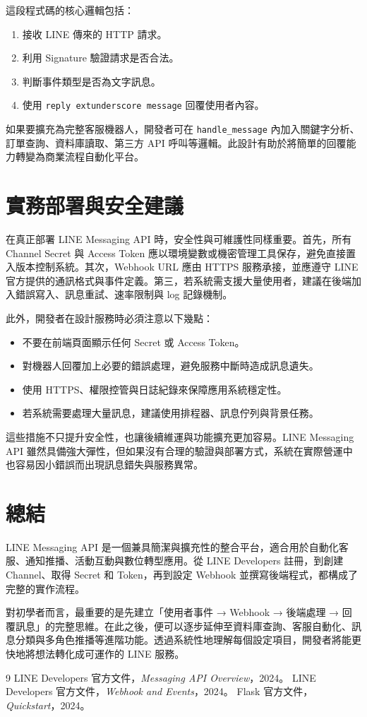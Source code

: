 這段程式碼的核心邏輯包括：
\begin{enumerate}[leftmargin=2em]
    \item 接收 LINE 傳來的 HTTP 請求。
    \item 利用 Signature 驗證請求是否合法。
    \item 判斷事件類型是否為文字訊息。
    \item 使用 \texttt{reply	extunderscore message} 回覆使用者內容。
\end{enumerate}

如果要擴充為完整客服機器人，開發者可在 \texttt{handle\_message} 內加入關鍵字分析、訂單查詢、資料庫讀取、第三方 API 呼叫等邏輯。此設計有助於將簡單的回覆能力轉變為商業流程自動化平台。

\section{實務部署與安全建議}

在真正部署 LINE Messaging API 時，安全性與可維護性同樣重要。首先，所有 Channel Secret 與 Access Token 應以環境變數或機密管理工具保存，避免直接置入版本控制系統。其次，Webhook URL 應由 HTTPS 服務承接，並應遵守 LINE 官方提供的通訊格式與事件定義。第三，若系統需支援大量使用者，建議在後端加入錯誤寫入、訊息重試、速率限制與 log 記錄機制。

此外，開發者在設計服務時必須注意以下幾點：
\begin{itemize}[leftmargin=2em]
    \item 不要在前端頁面顯示任何 Secret 或 Access Token。
    \item 對機器人回覆加上必要的錯誤處理，避免服務中斷時造成訊息遺失。
    \item 使用 HTTPS、權限控管與日誌紀錄來保障應用系統穩定性。
    \item 若系統需要處理大量訊息，建議使用排程器、訊息佇列與背景任務。
\end{itemize}

這些措施不只提升安全性，也讓後續維運與功能擴充更加容易。LINE Messaging API 雖然具備強大彈性，但如果沒有合理的驗證與部署方式，系統在實際營運中也容易因小錯誤而出現訊息錯失與服務異常。

\section{總結}

LINE Messaging API 是一個兼具簡潔與擴充性的整合平台，適合用於自動化客服、通知推播、活動互動與數位轉型應用。從 LINE Developers 註冊，到創建 Channel、取得 Secret 和 Token，再到設定 Webhook 並撰寫後端程式，都構成了完整的實作流程。

對初學者而言，最重要的是先建立「使用者事件 → Webhook → 後端處理 → 回覆訊息」的完整思維。在此之後，便可以逐步延伸至資料庫查詢、客服自動化、訊息分類與多角色推播等進階功能。透過系統性地理解每個設定項目，開發者將能更快地將想法轉化成可運作的 LINE 服務。

\begin{thebibliography}{9}
 LINE Developers 官方文件，\textit{Messaging API Overview}，2024。
 LINE Developers 官方文件，\textit{Webhook and Events}，2024。
 Flask 官方文件，\textit{Quickstart}，2024。
\end{thebibliography}

